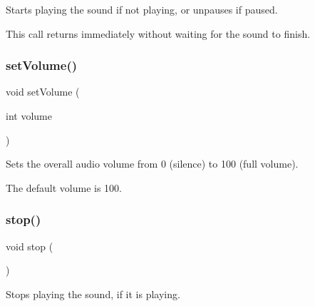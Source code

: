 Starts playing the sound if not playing, or unpauses if paused. 

This call returns immediately without waiting for the sound to finish. \mbox{\label{classGSound_a6715d5315d47c73b3838f2cb771e7b58}} 
\subsubsection{\texorpdfstring{set\+Volume()}{setVolume()}}
{\footnotesize\ttfamily void set\+Volume (\begin{DoxyParamCaption}\item[{int}]{volume }\end{DoxyParamCaption})\hspace{0.3cm}{\ttfamily [static]}}



Sets the overall audio volume from 0 (silence) to 100 (full volume). 

The default volume is 100. \mbox{\label{classGSound_a8c528baf37154d347366083f0f816846}} 
\subsubsection{\texorpdfstring{stop()}{stop()}}
{\footnotesize\ttfamily void stop (\begin{DoxyParamCaption}{ }\end{DoxyParamCaption})\hspace{0.3cm}{\ttfamily [static]}}



Stops playing the sound, if it is playing. 

